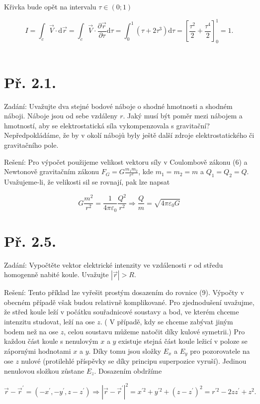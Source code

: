 \documentclass[czech,11pt,a4paper]{article}
\begin{document}
	Křivka bude opět na intervalu $\tau \in(0 ; 1)$
	
	$$
	I=\int_{c} \vec{V} \cdot \mathrm{d} \vec{r}=\int_{c} \vec{V} \cdot \frac{\partial \vec{r}}{\partial \tau} \mathrm{d} \tau=\int_{0}^{1}\left(\tau+2 \tau^{3}\right) \mathrm{d} \tau=\left[\frac{\tau^{2}}{2}+\frac{\tau^{4}}{2}\right]_{0}^{1}=1 .
	$$
	\\
	
	\section{Př. 2.1.}
	
	Zadání: Uvažujte dva stejné bodové náboje o shodné hmotnosti a shodném náboji. Náboje jsou od sebe vzdáleny $r$. Jaký musí být poměr mezi nábojem a hmotností, aby se elektrostatická síla vykompenzovala s gravitační? Nepředpokládáme, že by v okolí nábojů byly ještě další zdroje elektrostatického či gravitačního pole.
	
	Rešení: Pro výpočet použijeme velikost vektoru síly v Coulombově zákonu (6) a Newtonově gravitačním zákonu $F_{G}=G \frac{m_{1} m_{2}}{r^{2}}$, kde $m_{1}=m_{2}=m$ a $Q_{1}=Q_{2}=Q$. Uvažujeme-li, že velikosti sil se rovnají, pak lze napsat
	
	$$
	G \frac{m^{2}}{r^{2}}=\frac{1}{4 \pi \varepsilon_{0}} \frac{Q^{2}}{r^{2}} \Rightarrow \frac{Q}{m}=\sqrt{4 \pi \varepsilon_{0} G}
	$$
\section{Př. 2.5.}

Zadání: Vypočtěte vektor elektrické intenzity ve vzdálenosti $r$ od středu homogenně nabité koule. Uvažujte $|\vec{r}|>R$.

Rešení: Tento příklad lze vyřešit prostým dosazením do rovnice (9). Výpočty v obecném případě však budou relativně komplikované. Pro zjednodušení uvažujme, že střed koule leží v počátku souřadnicové soustavy a bod, ve kterém chceme intenzitu studovat, leží na ose $z$. ( $\mathrm{V}$ případě, kdy se chceme zabývat jiným bodem než na ose $z$, celou soustavu můžeme natočit díky kulové symetrii.) Pro každou část koule s nenulovým $x$ a $y$ existuje stejná část koule ležicí v poloze se zápornými hodnotami $x$ a $y$. Díky tomu jsou složky $E_{x}$ a $E_{y}$ pro pozorovatele na ose $z$ nulové (protilehlé příspěvky se díky principu superpozice vyruší). Jedinou nenulovou složkou zůstane $E_{z}$. Dosazením obdržíme

$$
\vec{r}-\vec{r}^{\prime}=\left(-x^{\prime},-y^{\prime}, z-z^{\prime}\right) \Rightarrow\left|\vec{r}-\vec{r}^{\prime}\right|^{2}=x^{\prime 2}+y^{\prime 2}+\left(z-z^{\prime}\right)^{2}=r^{\prime 2}-2 z z^{\prime}+z^{2} .
$$
\end{document}
